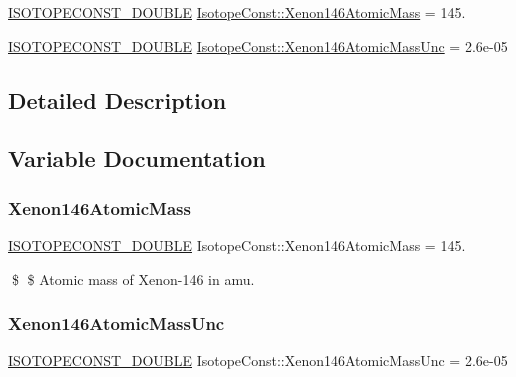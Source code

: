 \begin{DoxyCompactItemize}
\item 
\mbox{\hyperlink{group___isotope_const-_macros_ga8f45a7272ce02c0b4c65c44636ed719a}{I\+S\+O\+T\+O\+P\+E\+C\+O\+N\+S\+T\+\_\+\+D\+O\+U\+B\+LE}} \mbox{\hyperlink{group___isotope_const-_xenon-_xe146_ga308f78ddd0590842f2966f344b482937}{Isotope\+Const\+::\+Xenon146\+Atomic\+Mass}} = 145.
\item 
\mbox{\hyperlink{group___isotope_const-_macros_ga8f45a7272ce02c0b4c65c44636ed719a}{I\+S\+O\+T\+O\+P\+E\+C\+O\+N\+S\+T\+\_\+\+D\+O\+U\+B\+LE}} \mbox{\hyperlink{group___isotope_const-_xenon-_xe146_ga8a503f2f08677ec41f8a778ac6216db4}{Isotope\+Const\+::\+Xenon146\+Atomic\+Mass\+Unc}} = 2.\+6e-\/05
\end{DoxyCompactItemize}


\subsection{Detailed Description}


\subsection{Variable Documentation}
\mbox{\label{group___isotope_const-_xenon-_xe146_ga308f78ddd0590842f2966f344b482937}} 
\subsubsection{\texorpdfstring{Xenon146\+Atomic\+Mass}{Xenon146AtomicMass}}
{\footnotesize\ttfamily \mbox{\hyperlink{group___isotope_const-_macros_ga8f45a7272ce02c0b4c65c44636ed719a}{I\+S\+O\+T\+O\+P\+E\+C\+O\+N\+S\+T\+\_\+\+D\+O\+U\+B\+LE}} Isotope\+Const\+::\+Xenon146\+Atomic\+Mass = 145.}

\$ \$ Atomic mass of Xenon-\/146 in amu. \mbox{\label{group___isotope_const-_xenon-_xe146_ga8a503f2f08677ec41f8a778ac6216db4}} 
\subsubsection{\texorpdfstring{Xenon146\+Atomic\+Mass\+Unc}{Xenon146AtomicMassUnc}}
{\footnotesize\ttfamily \mbox{\hyperlink{group___isotope_const-_macros_ga8f45a7272ce02c0b4c65c44636ed719a}{I\+S\+O\+T\+O\+P\+E\+C\+O\+N\+S\+T\+\_\+\+D\+O\+U\+B\+LE}} Isotope\+Const\+::\+Xenon146\+Atomic\+Mass\+Unc = 2.\+6e-\/05}

